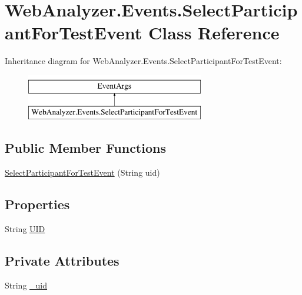 \hypertarget{class_web_analyzer_1_1_events_1_1_select_participant_for_test_event}{}\section{Web\+Analyzer.\+Events.\+Select\+Participant\+For\+Test\+Event Class Reference}
\label{class_web_analyzer_1_1_events_1_1_select_participant_for_test_event}
Inheritance diagram for Web\+Analyzer.\+Events.\+Select\+Participant\+For\+Test\+Event\+:\begin{figure}[H]
\begin{center}
\leavevmode
\includegraphics[height=2.000000cm]{class_web_analyzer_1_1_events_1_1_select_participant_for_test_event}
\end{center}
\end{figure}
\subsection*{Public Member Functions}
\begin{DoxyCompactItemize}
\item 
\hyperlink{class_web_analyzer_1_1_events_1_1_select_participant_for_test_event_acceeb9da0733201e24b579832bc8fdf5}{Select\+Participant\+For\+Test\+Event} (String uid)
\end{DoxyCompactItemize}
\subsection*{Properties}
\begin{DoxyCompactItemize}
\item 
String \hyperlink{class_web_analyzer_1_1_events_1_1_select_participant_for_test_event_a1749346fd01c6ff1a5561aa99d797dcc}{U\+I\+D}
\end{DoxyCompactItemize}
\subsection*{Private Attributes}
\begin{DoxyCompactItemize}
\item 
String \hyperlink{class_web_analyzer_1_1_events_1_1_select_participant_for_test_event_a22ee0c7588156074f32dce220259d041}{\+\_\+uid}
\end{DoxyCompactItemize}


